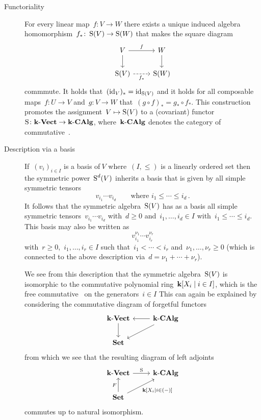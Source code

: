 \begin{recall}
\begin{description}
    \item[Functoriality]
      For every linear map~$f \colon V \to W$ there exists a unique induced algebra homomorphism~$f_* \colon \operatorname{S}(V) \to \operatorname{S}(W)$ that makes the square diagram
      \[
        \begin{tikzcd}
          V
          \arrow{r}[above]{f}
          \arrow{d}
          &
          W
          \arrow{d}
          \\
          \Symm(V)
          \arrow[dashed]{r}[below]{f_*}
          &
          \Symm(W)
        \end{tikzcd}
      \]
      commmute.
      It holds that~$(\operatorname{id}_V)_* = \operatorname{id}_{\operatorname{S}(V)}$ and it holds for all composable~{\linear{$\kf$}} maps~$f \colon U \to V$ and~$g \colon V \to W$ that~$(g \circ f)_* = g_* \circ f_*$.
      This construction promotes the assignment~$V \mapsto \operatorname{S}(V)$ to a (covariant) functor~$\operatorname{S} \colon \mathbf{k}\text{-}\mathbf{Vect} \to \mathbf{k}\text{-}\mathbf{CAlg}$, where~$\mathbf{k}\text{-}\mathbf{CAlg}$ denotes the category of commutative~{\algebras{$\kf$}}.
      
    \item[Description via a basis]
      If~$(v_i)_{i \in I}$ is a basis of$~V$ where~$(I, \leq)$ is a linearly ordered set then the symmetric power~$\operatorname{S}^d(V)$ inherits a basis that is given by all simple symmetric tensors
      \[
        v_{i_1} \dotsm v_{i_d}
        \qquad
        \text{where~$i_1 \leq \dotsb \leq i_d$} \,.
      \]
      It follows that the symmetric algebra~$\operatorname{S}(V)$ has as a basis all simple symmetric tensors~$v_{i_1} \dotsm v_{i_d}$ with~$d \geq 0$ and~$i_1, \dotsc, i_d \in I$ with~$i_1 \leq \dotsb \leq i_d$.
      This basis may also be written as
      \[
        v_{i_1}^{\nu_1} \dotsm v_{i_r}^{\nu_r}
      \]
      with~$r \geq 0$,~$i_1, \dotsc, i_r \in I$ such that~$i_1 < \dotsb < i_r$ and~$\nu_1, \dotsc, \nu_r \geq 0$ (which is connected to the above description via~$d = \nu_1 + \dotsb + \nu_r$).
      
      We see from this description that the symmetric algebra~$\operatorname{S}(V)$ is isomorphic to the commutative polynomial ring~$\kf[X_i \suchthat i \in I]$, which is the free commutative~{\algebra{$\kf$}} on the generators~$i \in I$
      This can again be explained by considering the commutative diagram of forgetful functors
      \[
        \begin{tikzcd}
          \cVect{\kf}
          \arrow{d}
          &
          \cCAlg{\kf}
          \arrow{l}
          \arrow{dl}
          \\
          \cSet
          &
          {}
        \end{tikzcd}
      \]
      from which we see that the resulting diagram of left adjoints
      \[
        \begin{tikzcd}
          \cVect{\kf}
          \arrow{r}[above]{\Symm}
          &
          \cCAlg{\kf}
          \\
          \cSet
          \arrow{u}[left]{F}
          \arrow{ur}[below right]{\kf[X_i \suchthat i \in (-)]}
          &
          {}
        \end{tikzcd}
      \]
      commutes up to natural isomorphism.
      

\end{description}
\end{recall}
